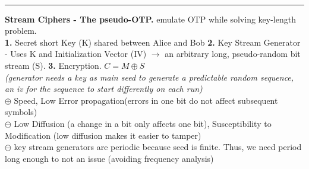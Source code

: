 \documentclass[9pt, a4paper]{extarticle}
\makeatletter
\renewcommand{\hline}{\noalign{\vskip 2px}\hrule\@height\arrayrulewidth\@width\linewidth\noalign{\vskip 2px}}
\makeatother
\begin{document}
\begin{minipage}[t]{0.495\textwidth}
\begin{minipage}[t]{0.59\textwidth}
	\end{minipage}\\\hline
	\textbf{Stream Ciphers - The pseudo-OTP.} emulate OTP while solving key-length problem.\\
	\textbf{1.} Secret short Key (K) shared between Alice and Bob \quad \textbf{2.} Key Stream Generator - Uses K and Initialization Vector (IV) $\rightarrow$ an arbitrary long, pseudo-random bit stream (S). \quad \textbf{3.} Encryption. $C = M \oplus S$\\
	\textit{(generator needs a key as main seed to generate a predictable random sequence, an iv for the sequence to start differently on each run)}\\
	$\oplus$ Speed, Low Error propagation(errors in one bit do not affect subsequent symbols)\\
	$\ominus$ Low Diffusion (a change in a bit only affects one bit), Susceptibility to Modification (low diffusion makes it easier to tamper)\\
	$\ominus$ key stream generators are periodic because seed is finite. Thus, we need period long enough to not an issue (avoiding frequency analysis)\\
\end{minipage}
\end{document}
